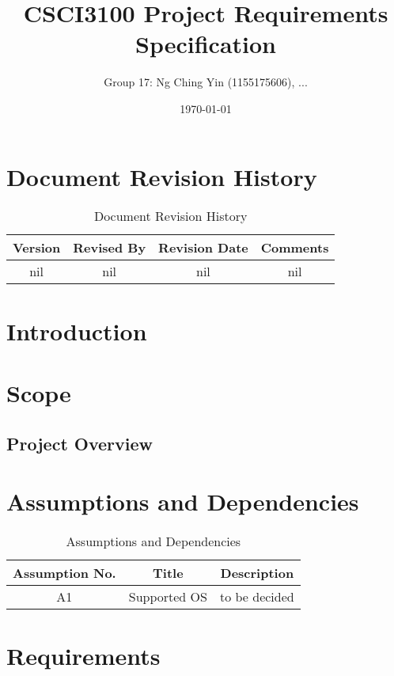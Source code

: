 \documentclass[11pt]{article}
\title{CSCI3100 Project Requirements Specification}
\author{Group 17: Ng Ching Yin (1155175606), ...}
\date{\today}
\begin{document}
\maketitle

{
    \hypersetup{linkcolor=black}
    \tableofcontents
}

\newpage

\section{Document Revision History}
\begin{table}[h]
    \centering
    \caption{Document Revision History}
    \begin{tabular}{cccc}
        \toprule
        Version & Revised By & Revision Date & Comments \\
        \midrule
        nil & nil & nil & nil \\
        \bottomrule
    \end{tabular}
    \label{tab:docs_rev_hist}
\end{table}

\section{Introduction}

\section{Scope}

\subsection{Project Overview}

\section{Assumptions and Dependencies}
\begin{table}[h]
    \centering
    \caption{Assumptions and Dependencies}
    \begin{tabular}{ccc}
        \toprule
        Assumption No. & Title & Description \\
        \midrule
        A1 & Supported OS & to be decided \\
        \bottomrule
    \end{tabular}
    \label{tab:docs_rev_hist}
\end{table}

\section{Requirements}
\end{document}

